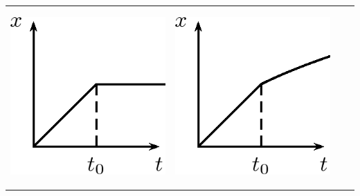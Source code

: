 \begin{enumerate}[noitemsep, label=\textbf{\arabic*}. ]
\begin{center}
\begin{xtabular*}{\mytablewidth}[t]{|p{10\mystarwidth}|p{10\mystarwidth}|p{10\mystarwidth}|p{10\mystarwidth}|}
\label{m38796*id81674}
    \begin{center}
    \label{m38796*id81674!!!underscore!!!media}\label{m38796*id81674!!!underscore!!!printimage}\includegraphics[width=300px]{col11305.imgs/m38796_PG10C2_049.png} %
        
      \vspace{2pt}
    \vspace{.1in}
    
    \end{center}



    \addtocounter{footnote}{-0}
     &
    
    
        
    \setcounter{subfigure}{0}

\label{m38796*id81684}
    \begin{center}
    \label{m38796*id81684!!!underscore!!!media}\label{m38796*id81684!!!underscore!!!printimage}\includegraphics[width=300px]{col11305.imgs/m38796_PG10C2_050.png} %
        

\end{center}
\end{xtabular*}
\end{center}
\end{enumerate}
